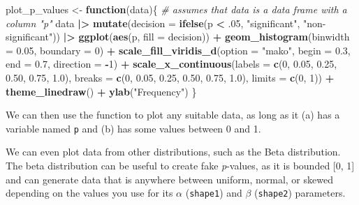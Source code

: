 \documentclass[
]{article}
\newenvironment{Shaded}{\begin{snugshade}}{\end{snugshade}}
\newcommand{\AttributeTok}[1]{\textcolor[rgb]{0.13,0.29,0.53}{#1}}
\newcommand{\CommentTok}[1]{\textcolor[rgb]{0.56,0.35,0.01}{\textit{#1}}}
\newcommand{\ControlFlowTok}[1]{\textcolor[rgb]{0.13,0.29,0.53}{\textbf{#1}}}
\newcommand{\DecValTok}[1]{\textcolor[rgb]{0.00,0.00,0.81}{#1}}
\newcommand{\FloatTok}[1]{\textcolor[rgb]{0.00,0.00,0.81}{#1}}
\newcommand{\FunctionTok}[1]{\textcolor[rgb]{0.13,0.29,0.53}{\textbf{#1}}}
\newcommand{\NormalTok}[1]{#1}
\newcommand{\OtherTok}[1]{\textcolor[rgb]{0.56,0.35,0.01}{#1}}
\newcommand{\SpecialCharTok}[1]{\textcolor[rgb]{0.81,0.36,0.00}{\textbf{#1}}}
\newcommand{\StringTok}[1]{\textcolor[rgb]{0.31,0.60,0.02}{#1}}
\begin{document}
\begin{Shaded}
\begin{Highlighting}[]
\NormalTok{plot\_p\_values }\OtherTok{\textless{}{-}} \ControlFlowTok{function}\NormalTok{(data)\{ }\CommentTok{\# assumes that data is a data frame with a column "p"}
\NormalTok{  data }\SpecialCharTok{|\textgreater{}}
    \FunctionTok{mutate}\NormalTok{(}\AttributeTok{decision =} \FunctionTok{ifelse}\NormalTok{(p }\SpecialCharTok{\textless{}}\NormalTok{ .}\DecValTok{05}\NormalTok{, }\StringTok{"significant"}\NormalTok{, }\StringTok{"non{-}significant"}\NormalTok{)) }\SpecialCharTok{|\textgreater{}}
    \FunctionTok{ggplot}\NormalTok{(}\FunctionTok{aes}\NormalTok{(p, }\AttributeTok{fill =}\NormalTok{ decision)) }\SpecialCharTok{+}
    \FunctionTok{geom\_histogram}\NormalTok{(}\AttributeTok{binwidth =} \FloatTok{0.05}\NormalTok{, }\AttributeTok{boundary =} \DecValTok{0}\NormalTok{) }\SpecialCharTok{+}
    \FunctionTok{scale\_fill\_viridis\_d}\NormalTok{(}\AttributeTok{option =} \StringTok{"mako"}\NormalTok{, }\AttributeTok{begin =} \FloatTok{0.3}\NormalTok{, }\AttributeTok{end =} \FloatTok{0.7}\NormalTok{, }\AttributeTok{direction =} \SpecialCharTok{{-}}\DecValTok{1}\NormalTok{) }\SpecialCharTok{+}
    \FunctionTok{scale\_x\_continuous}\NormalTok{(}\AttributeTok{labels =} \FunctionTok{c}\NormalTok{(}\DecValTok{0}\NormalTok{, }\FloatTok{0.05}\NormalTok{, }\FloatTok{0.25}\NormalTok{, }\FloatTok{0.50}\NormalTok{, }\FloatTok{0.75}\NormalTok{, }\FloatTok{1.0}\NormalTok{),}
                       \AttributeTok{breaks =} \FunctionTok{c}\NormalTok{(}\DecValTok{0}\NormalTok{, }\FloatTok{0.05}\NormalTok{, }\FloatTok{0.25}\NormalTok{, }\FloatTok{0.50}\NormalTok{, }\FloatTok{0.75}\NormalTok{, }\FloatTok{1.0}\NormalTok{), }
                       \AttributeTok{limits =} \FunctionTok{c}\NormalTok{(}\DecValTok{0}\NormalTok{, }\DecValTok{1}\NormalTok{)) }\SpecialCharTok{+}
    \FunctionTok{theme\_linedraw}\NormalTok{() }\SpecialCharTok{+}
    \FunctionTok{ylab}\NormalTok{(}\StringTok{"Frequency"}\NormalTok{)}
\NormalTok{\}}
\end{Highlighting}
\end{Shaded}

We can then use the function to plot any suitable data, as long as it
(a) has a variable named \texttt{p} and (b) has some values between 0
and 1.

We can even plot data from other distributions, such as the Beta
distribution. The beta distribution can be useful to create fake
\emph{p}-values, as it is bounded {[}0, 1{]} and can generate data that
is anywhere between uniform, normal, or skewed depending on the values
you use for its \(\alpha\) (\texttt{shape1}) and \(\beta\)
(\texttt{shape2}) parameters.
\end{document}
